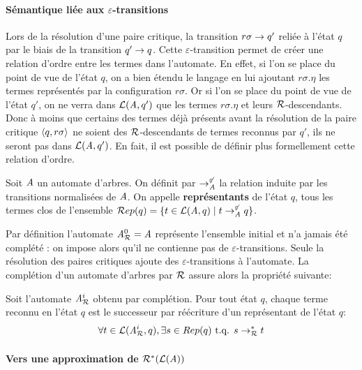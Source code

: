 \paragraph{Sémantique liée aux $\varepsilon$-transitions}
Lors de la résolution d'une paire critique, la transition $r\sigma \rightarrow q'$ reliée à l'état $q$ par le biais de la transition
$q' \rightarrow q$. Cette $\varepsilon$-transition permet de créer une relation d'ordre entre les termes dans l'automate.
En effet, si l'on se place du point de vue de l'état $q$, on a bien étendu le langage en lui ajoutant $r\sigma.\eta$
les termes représentés par la configuration $r\sigma$. Or si l'on se place du point de vue de l'état $q'$, on ne verra dans $\mathcal{L}(\mathit A,q')$
que les termes $r\sigma.\eta$ et leurs $\mathcal R$-descendants. Donc à moins que certains des termes déjà présents avant la résolution
de la paire critique $\langle q, r\sigma\rangle$ ne soient des $\mathcal R$-descendants de termes reconnus par $q'$, ils ne seront pas dans $\mathcal{L}(\mathit A, q')$.
En fait, il est possible de définir plus formellement cette relation d'ordre.
\begin{definition}
  \label{def:representants}
  Soit $\mathit A$ un automate d'arbres. On définit par $\rightarrow^{\not\varepsilon}_\mathit A$ la relation induite par les transitions normalisées de $\mathit A$.
  On appelle \textbf{représentants} de l'état $q$, tous les termes clos de l'ensemble $\mathcal R ep(q) = \{t \in \mathcal{L}(\mathit A, q)\; | \; t \rightarrow^{\not\varepsilon}_\mathit A q\}$.
\end{definition}

Par définition l'automate ${\mathit A}_{\mathcal R}^0 = \mathit A$ représente l'ensemble initial et n'a jamais été complété : on impose alors qu'il ne contienne pas 
de $\varepsilon$-transitions. Seule la résolution des paires critiques ajoute des $\varepsilon$-transitions à l'automate.
La complétion d'un automate d'arbres par $\mathcal R$ assure alors la propriété suivante:


\begin{property}
  Soit l'automate ${\mathit A}_{\mathcal R}^i$ obtenu par complétion. Pour tout état $q$, 
  chaque terme reconnu en l'état $q$ est le successeur par réécriture d'un représentant 
  de l'état $q$:
  \[\forall t \in \mathcal{L}({\mathit A}_{\mathcal R}^i, q), \exists s \in Rep(q) \mbox{ t.q. } s \rightarrow_\mathcal R^* t\]
\end{property}



\paragraph{Vers une approximation de $\mathcal R^*(\mathcal{L}(\mathit A))$}


